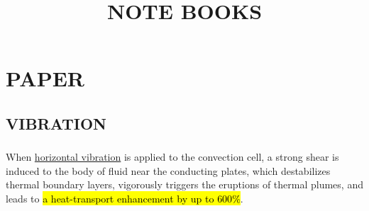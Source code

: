\documentclass{hmj}
\title{NOTE BOOKS}
\begin{document}
\maketitle

\begin{tcolorbox}[colback=black!5!white,colframe=white]
\begin{center}
{\color{dkgreen}{ %
The description of this files 文件说明%
 }}
 \end{center}
 \end{tcolorbox}
 
 \tableofcontents   %
  \newpage
  
 \section{PAPER}
\subsection{VIBRATION}
\subsubsection{\cite{Wang2020d}}
When \ul{horizontal vibration} is applied to the convection cell, a strong shear is induced to the body of fluid near the conducting plates, which destabilizes thermal boundary layers, vigorously triggers the eruptions of thermal plumes, and leads to \hl{a heat-transport enhancement by up to $600\%$}.
\end{document}

